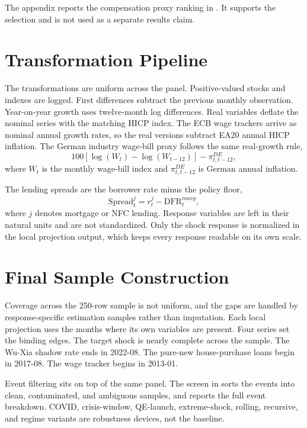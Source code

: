The appendix reports the compensation proxy ranking in . It supports the selection and is not used as a separate results claim.

\section{Transformation Pipeline}

The transformations are uniform across the panel. Positive-valued stocks and indexes are logged. First differences subtract the previous monthly observation. Year-on-year growth uses twelve-month log differences. Real variables deflate the nominal series with the matching HICP index. The ECB wage trackers arrive as nominal annual growth rates, so the real versions subtract EA20 annual HICP inflation. The German industry wage-bill proxy follows the same real-growth rule,
\begin{equation}
  100\left[\log(W_t) - \log(W_{t-12})\right] - \pi^{DE}_{t,t-12},
  \label{eq:real-wage-bill}
\end{equation}
where \(W_t\) is the monthly wage-bill index and \(\pi^{DE}_{t,t-12}\) is German annual inflation.

The lending spreads are the borrower rate minus the policy floor,
\begin{equation}
  \mathrm{Spread}^{j}_{t}
  =
  r^{j}_{t}
  -
  \mathrm{DFR}^{mavg}_{t},
  \label{eq:lending-spread}
\end{equation}
where \(j\) denotes mortgage or NFC lending. Response variables are left in their natural units and are not standardized. Only the shock response is normalized in the local projection output, which keeps every response readable on its own scale.

\section{Final Sample Construction}

Coverage across the 250-row sample is not uniform, and the gaps are handled by response-specific estimation samples rather than imputation. Each local projection uses the months where its own variables are present. Four series set the binding edges. The target shock is nearly complete across the sample. The Wu-Xia shadow rate ends in 2022-08. The pure-new house-purchase loans begin in 2017-08. The wage tracker begins in 2013-01.

Event filtering sits on top of the same panel. The screen in  sorts the events into clean, contaminated, and ambiguous samples, and  reports the full event breakdown. COVID, crisis-window, QE-launch, extreme-shock, rolling, recursive, and regime variants are robustness devices, not the baseline.

